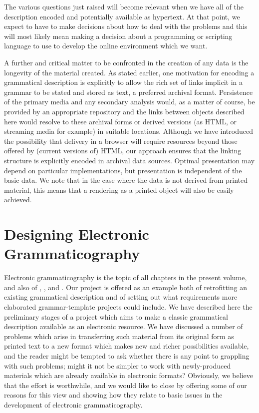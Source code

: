 The various questions just raised will become relevant when we have all of the description encoded and potentially available as hypertext. At that point, we expect to have to make decisions about how to deal with the problems and this will most likely mean making a decision about a programming or scripting language to use to develop the online environment which we want. 

A further and critical matter to be confronted in the creation of any data is the longevity of the material created. As stated earlier, one motivation for encoding a grammatical description is explicitly to allow the rich set of links implicit in a grammar to be stated and stored as text, a preferred archival format. Persistence of the primary media and any secondary analysis would, as a matter of course, be provided by an appropriate repository and the links between objects described here would resolve to these archival forms or derived versions (as HTML, or streaming media for example) in suitable locations. Although we have introduced the possibility that delivery in a browser will require resources beyond those offered by (current versions of) HTML, our approach ensures that the linking structure is explicitly encoded in archival data sources. Optimal presentation may depend on particular implementations, but presentation is independent of the basic data. We note that in the case where the data is not derived from printed material, this means that a rendering as a printed object will also be easily achieved.

\section{Designing Electronic Grammaticography}
Electronic grammaticography is the topic of all chapters in the present volume, and also of \citet{Good2004}, \citet{Nordhoff2008}, and \citet{BenderEtAl2004}. Our project is offered as an example both of retrofitting an existing grammatical description and of setting out what requirements more elaborated grammar-template projects could include. We have described here the preliminary stages of a project which aims to make a classic grammatical description available as an electronic resource. We have discussed a number of problems which arise in transferring such material from its original form as printed text to a new format which makes new and richer possibilities available, and the reader might be tempted to ask whether there is any point to grappling with such problems; might it not be simpler to work with newly-produced materials which are already available in electronic formats? Obviously, we believe that the effort is worthwhile, and we would like to close by offering some of our reasons for this view and showing how they relate to basic issues in the development of electronic grammaticography.

